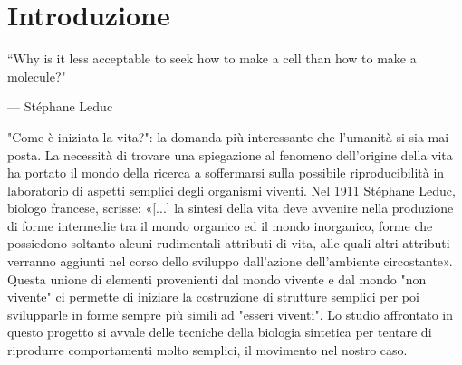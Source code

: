 \chapter{Introduzione}
\vspace{0.5cm}
\label{cha:intro}
\epigraph{“Why is it less acceptable to seek how to make a cell than how to make a molecule?"}{--- \textup{Stéphane Leduc}}

"Come è iniziata la vita?": la domanda più interessante che l'umanità si sia mai posta. La necessità di trovare una spiegazione al fenomeno dell'origine della vita ha portato il mondo della ricerca a soffermarsi sulla possibile riproducibilità in laboratorio di aspetti semplici degli organismi viventi. 
Nel 1911 Stéphane Leduc, biologo francese, scrisse: «[...] la sintesi della vita deve avvenire nella produzione di forme intermedie tra il mondo organico ed il mondo inorganico, forme che possiedono soltanto alcuni rudimentali attributi di vita, alle quali altri attributi verranno aggiunti nel corso dello sviluppo dall'azione dell'ambiente circostante». Questa unione di elementi provenienti dal mondo vivente e dal mondo "non vivente" ci permette di iniziare la costruzione di strutture semplici per poi svilupparle in forme sempre più simili ad "esseri viventi". 
Lo studio affrontato in questo progetto si avvale delle tecniche della biologia sintetica per tentare di riprodurre comportamenti molto semplici, il movimento nel nostro caso.


